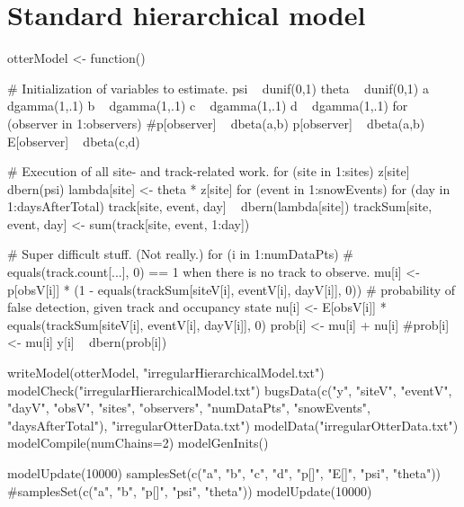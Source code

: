 \documentclass[12pt]{article}
\begin{document}
\section{Standard hierarchical model}
\scriptsize
\begin{verbatimtab}
otterModel <- function() {
    # Initialization of variables to estimate.
    psi ~ dunif(0,1)
    theta ~ dunif(0,1)
    a ~ dgamma(1,.1)
    b ~ dgamma(1,.1)
    c ~ dgamma(1,.1)
    d ~ dgamma(1,.1)
    for (observer in 1:observers) {
        #p[observer] ~ dbeta(a,b)
        p[observer] ~ dbeta(a,b) %
        E[observer] ~ dbeta(c,d) %
    }

    # Execution of all site- and track-related work.
    for (site in 1:sites) {
        z[site] ~ dbern(psi)
        lambda[site] <- theta * z[site]
        for (event in 1:snowEvents) {
            for (day in 1:daysAfterTotal) {
                track[site, event, day] ~ dbern(lambda[site])
                trackSum[site, event, day] <- sum(track[site, event, 1:day])
            }
        }
    }

    # Super difficult stuff.  (Not really.)
    for (i in 1:numDataPts) {
        # equals(track.count[...], 0) == 1 when there is no track to observe.
        mu[i] <- 
            p[obsV[i]] * (1 - equals(trackSum[siteV[i], eventV[i], dayV[i]], 0))
        # probability of false detection, given track and occupancy state
        nu[i] <- E[obsV[i]] * equals(trackSum[siteV[i], eventV[i], dayV[i]], 0)
        prob[i] <- mu[i] + nu[i]
        #prob[i] <- mu[i]
        y[i] ~ dbern(prob[i])
    }
}

writeModel(otterModel, "irregularHierarchicalModel.txt")
modelCheck("irregularHierarchicalModel.txt")
bugsData(c("y", "siteV", "eventV", "dayV", "obsV", "sites", "observers",
           "numDataPts", "snowEvents", "daysAfterTotal"), 
         "irregularOtterData.txt")
modelData("irregularOtterData.txt")
modelCompile(numChains=2)
modelGenInits()

modelUpdate(10000)
samplesSet(c("a", "b", "c", "d", "p[]", "E[]", "psi", "theta"))
#samplesSet(c("a", "b", "p[]", "psi", "theta"))
modelUpdate(10000)
\end{verbatimtab}
\end{document}
